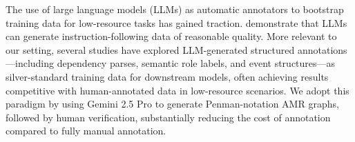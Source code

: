 The use of large language models (LLMs) as automatic annotators to bootstrap training data for low-resource tasks has gained traction. \citet{wang2023selfinstruct} demonstrate that LLMs can generate instruction-following data of reasonable quality. More relevant to our setting, several studies have explored LLM-generated structured annotations—including dependency parses, semantic role labels, and event structures—as silver-standard training data for downstream models, often achieving results competitive with human-annotated data in low-resource scenarios. We adopt this paradigm by using Gemini 2.5 Pro to generate Penman-notation AMR graphs, followed by human verification, substantially reducing the cost of annotation compared to fully manual annotation.
